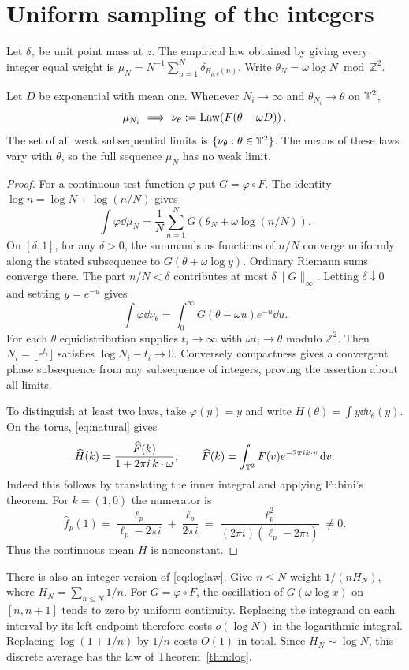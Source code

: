 \section{Uniform sampling of the integers}\label{sec:natural}
Let $\delta_z$ be unit point mass at $z$. The empirical law obtained by
giving every integer equal weight is
$\mu_N=N^{-1}\sum_{n=1}^N\delta_{R_{p,q}(n)}$.
Write $\theta_N=\omega\log N\bmod\mathbb Z^2$.
\begin{theorem}\label{thm:natural}
Let $D$ be exponential with mean one. Whenever $N_i\to\infty$ and
$\theta_{N_i}\to\theta$ on $\mathbb T^2$,
\[
 \mu_{N_i}\ \Longrightarrow\ \nu_\theta
   :=\operatorname{Law}\!\left(F(\theta-\omega D)\right).
\]
The set of all weak subsequential limits is
$\{\nu_\theta:\theta\in\mathbb T^2\}$. The means of these laws vary with
$\theta$, so the full sequence $\mu_N$ has no weak limit.
\end{theorem}
\begin{proof}
For a continuous test function $\varphi$ put $G=\varphi\circ F$.
The identity $\log n=\log N+\log(n/N)$ gives
\[
 \int\varphi\dd\mu_N=\frac1N\sum_{n=1}^N
 G(\theta_N+\omega\log(n/N)).
\]
On $[\delta,1]$, for any $\delta>0$, the summands as functions of $n/N$
converge uniformly along the stated subsequence to
$G(\theta+\omega\log y)$. Ordinary Riemann sums converge there.
The part $n/N<\delta$ contributes at most $\delta\|G\|_\infty$.
Letting $\delta\downarrow0$ and setting $y=e^{-u}$ gives
\begin{equation}
 \int\varphi\dd\nu_\theta=
 \int_0^\infty G(\theta-\omega u)e^{-u}\dd u. \label{eq:natural}
\end{equation}
For each $\theta$ equidistribution supplies $t_i\to\infty$ with
$\omega t_i\to\theta$ modulo $\mathbb Z^2$. Then
$N_i=\lfloor e^{t_i}\rfloor$ satisfies $\log N_i-t_i\to0$.
Conversely compactness gives a convergent phase subsequence from
any subsequence of integers, proving the assertion about all limits.

To distinguish at least two laws, take $\varphi(y)=y$ and write
$H(\theta)=\int y\dd\nu_\theta(y)$. On the torus, \eqref{eq:natural}
gives
\[
 \widehat H(k)=\frac{\widehat F(k)}{1+2\pi i\,k\cdot\omega},\qquad
 \widehat F(k)=\int_{\mathbb T^2}F(v)e^{-2\pi i k\cdot v}\,\mathrm d v .
\]
Indeed this follows by translating the inner integral and applying
Fubini's theorem. For $k=(1,0)$ the numerator is
\[
 \widehat f_p(1)=
 \frac{\ell_p}{\ell_p-2\pi i}+\frac{\ell_p}{2\pi i}
 =\frac{\ell_p^2}{(2\pi i)(\ell_p-2\pi i)}\ne0.
\]
Thus the continuous mean $H$ is nonconstant.
\end{proof}
There is also an integer version of \eqref{eq:loglaw}. Give $n\leq N$
weight $1/(nH_N)$, where $H_N=\sum_{n\leq N}1/n$. For
$G=\varphi\circ F$, the oscillation of $G(\omega\log x)$ on
$[n,n+1]$ tends to zero by uniform continuity. Replacing the
integrand on each interval by its left endpoint therefore costs
$o(\log N)$ in the logarithmic integral. Replacing
$\log(1+1/n)$ by $1/n$ costs $O(1)$ in total. Since
$H_N\sim\log N$, this discrete average has the law of Theorem~\ref{thm:log}.

